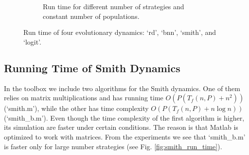 \documentclass[a4paper,10pt]{article}
\begin{document}
\begin{figure}
\begin{subfigure}[b]{0.45\textwidth}
                \caption{Run time for different number  of strategies and constant number of populations.}
                \label{fig:run_time_str}
        \end{subfigure}
        \caption{Run time of four evolutionary dynamics: `rd', `bnn', `smith', and `logit'.}
        \label{fig:run_time}
\end{figure}




\subsection{Running Time of Smith Dynamics }

In the toolbox we include two algorithms for the Smith dynamics. One of them relies on matrix multiplications and has running time $O(P(T_f(n,P) + n^2))$ (`smith.m'), while the other has time complexity $O(P(T_f(n,P) + n \log n))$ (`smith\_b.m'). Even though the time complexity of the first algorithm is higher, its simulation are faster under certain conditions. The reason is that Matlab is optimized to work with matrices. From the experiments we see that  `smith\_b.m' is faster only for large number strategies (see Fig. \ref{fig:smith_run_time}).
\end{document}
